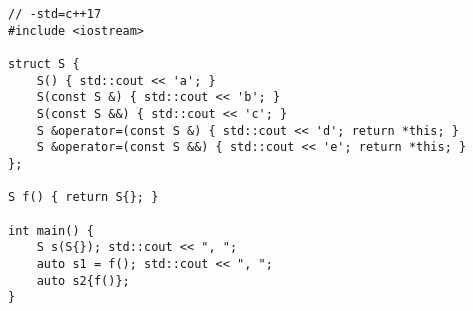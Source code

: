 \begin{lstlisting}[title=\href{https://godbolt.org/z/DcecG_}{\texttt{godbolt.org/z/DcecG\_}}]
// -std=c++17
#include <iostream>

struct S {
    S() { std::cout << 'a'; }
    S(const S &) { std::cout << 'b'; }
    S(const S &&) { std::cout << 'c'; }
    S &operator=(const S &) { std::cout << 'd'; return *this; }
    S &operator=(const S &&) { std::cout << 'e'; return *this; }
};

S f() { return S{}; }

int main() {
    S s(S{}); std::cout << ", ";
    auto s1 = f(); std::cout << ", ";
    auto s2{f()}; 
}
\end{lstlisting}
